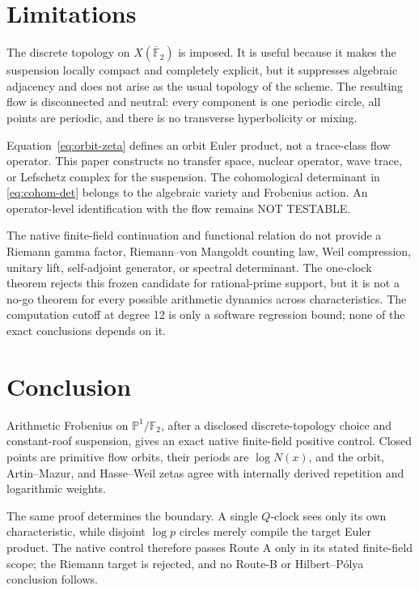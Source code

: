 \documentclass[11pt]{article}
\theoremstyle{definition}
\theoremstyle{remark}
\newcommand{\F}{\mathbb{F}}
\newcommand{\nottest}{\textsf{NOT TESTABLE}}
\begin{document}
\section{Limitations}
\label{sec:limitations}

The discrete topology on \(X(\overline{\F}_2)\) is imposed.  It is useful
because it makes the suspension locally compact and completely explicit, but
it suppresses algebraic adjacency and does not arise as the usual topology of
the scheme.  The resulting flow is disconnected and neutral: every component
is one periodic circle, all points are periodic, and there is no transverse
hyperbolicity or mixing.

Equation~\eqref{eq:orbit-zeta} defines an orbit Euler product, not a
trace-class flow operator.  This paper constructs no transfer space, nuclear
operator, wave trace, or Lefschetz complex for the suspension.  The
cohomological determinant in \eqref{eq:cohom-det} belongs to the algebraic
variety and Frobenius action.  An operator-level identification with the flow
remains \nottest.

The native finite-field continuation and functional relation do not provide a
Riemann gamma factor, Riemann--von Mangoldt counting law, Weil compression,
unitary lift, self-adjoint generator, or spectral determinant.  The
one-clock theorem rejects this frozen candidate for rational-prime support,
but it is not a no-go theorem for every possible arithmetic dynamics across
characteristics.  The computation cutoff at degree 12 is only a software
regression bound; none of the exact conclusions depends on it.

\section{Conclusion}

Arithmetic Frobenius on \(\mathbb P^1/\F_2\), after a disclosed
discrete-topology choice and constant-roof suspension, gives an exact native
finite-field positive control.  Closed points are primitive flow orbits,
their periods are \(\log N(x)\), and the orbit, Artin--Mazur, and Hasse--Weil
zetas agree with internally derived repetition and logarithmic weights.

The same proof determines the boundary.  A single \(Q\)-clock sees only its
own characteristic, while disjoint \(\log p\) circles merely compile the
target Euler product.  The native control therefore passes Route A only in
its stated finite-field scope; the Riemann target is rejected, and no Route-B
or Hilbert--P\'olya conclusion follows.
\end{document}
